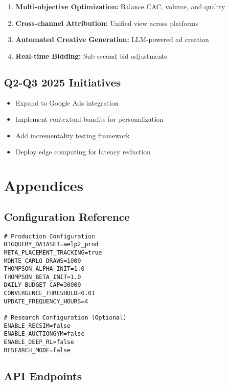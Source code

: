 \documentclass[11pt,a4paper]{report}
\begin{document}
\begin{enumerate}
\item \textbf{Multi-objective Optimization:} Balance CAC, volume, and quality
\item \textbf{Cross-channel Attribution:} Unified view across platforms
\item \textbf{Automated Creative Generation:} LLM-powered ad creation
\item \textbf{Real-time Bidding:} Sub-second bid adjustments
\end{enumerate}

\section{Q2-Q3 2025 Initiatives}

\begin{itemize}
\item Expand to Google Ads integration
\item Implement contextual bandits for personalization
\item Add incrementality testing framework
\item Deploy edge computing for latency reduction
\end{itemize}

\clearpage

\chapter{Appendices}

\section{Configuration Reference}

\begin{verbatim}
# Production Configuration
BIGQUERY_DATASET=aelp2_prod
META_PLACEMENT_TRACKING=true
MONTE_CARLO_DRAWS=1000
THOMPSON_ALPHA_INIT=1.0
THOMPSON_BETA_INIT=1.0
DAILY_BUDGET_CAP=30000
CONVERGENCE_THRESHOLD=0.01
UPDATE_FREQUENCY_HOURS=4

# Research Configuration (Optional)
ENABLE_RECSIM=false
ENABLE_AUCTIONGYM=false
ENABLE_DEEP_RL=false
RESEARCH_MODE=false
\end{verbatim}

\section{API Endpoints}
\end{document}

